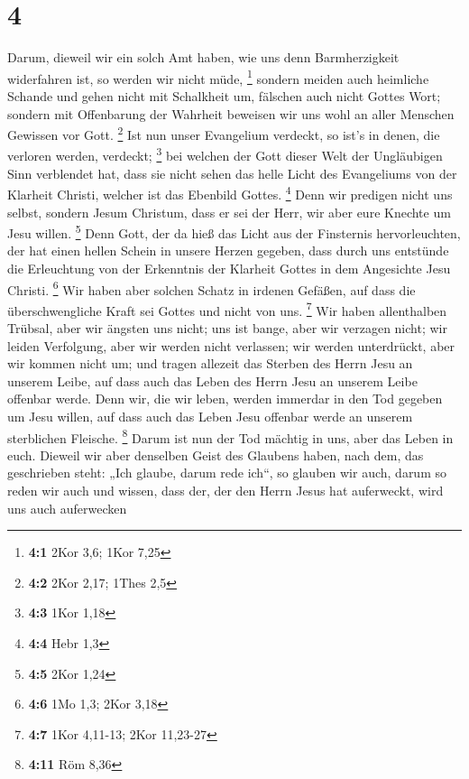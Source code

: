\hypertarget{section-3}{%
\section{4}\label{section-3}}

 Darum, dieweil wir ein solch Amt haben, wie uns denn
Barmherzigkeit widerfahren ist, so werden wir nicht müde, \footnote{\textbf{4:1}
  2Kor 3,6; 1Kor 7,25}  sondern meiden auch heimliche
Schande und gehen nicht mit Schalkheit um, fälschen auch nicht Gottes
Wort; sondern mit Offenbarung der Wahrheit beweisen wir uns wohl an
aller Menschen Gewissen vor Gott. \footnote{\textbf{4:2} 2Kor 2,17;
  1Thes 2,5}  Ist nun unser Evangelium verdeckt, so ist's
in denen, die verloren werden, verdeckt; \footnote{\textbf{4:3} 1Kor
  1,18}  bei welchen der Gott dieser Welt der Ungläubigen
Sinn verblendet hat, dass sie nicht sehen das helle Licht des
Evangeliums von der Klarheit Christi, welcher ist das Ebenbild Gottes.
\footnote{\textbf{4:4} Hebr 1,3}  Denn wir predigen nicht
uns selbst, sondern Jesum Christum, dass er sei der Herr, wir aber eure
Knechte um Jesu willen. \footnote{\textbf{4:5} 2Kor 1,24} 
Denn Gott, der da hieß das Licht aus der Finsternis hervorleuchten, der
hat einen hellen Schein in unsere Herzen gegeben, dass durch uns
entstünde die Erleuchtung von der Erkenntnis der Klarheit Gottes in dem
Angesichte Jesu Christi. \footnote{\textbf{4:6} 1Mo 1,3; 2Kor 3,18}
 Wir haben aber solchen Schatz in irdenen Gefäßen, auf
dass die überschwengliche Kraft sei Gottes und nicht von uns.
\footnote{\textbf{4:7} 1Kor 4,11-13; 2Kor 11,23-27}  Wir
haben allenthalben Trübsal, aber wir ängsten uns nicht; uns ist bange,
aber wir verzagen nicht;  wir leiden Verfolgung, aber wir
werden nicht verlassen; wir werden unterdrückt, aber wir kommen nicht
um;  und tragen allezeit das Sterben des Herrn Jesu an
unserem Leibe, auf dass auch das Leben des Herrn Jesu an unserem Leibe
offenbar werde.  Denn wir, die wir leben, werden immerdar
in den Tod gegeben um Jesu willen, auf dass auch das Leben Jesu offenbar
werde an unserem sterblichen Fleische. \footnote{\textbf{4:11} Röm 8,36}
 Darum ist nun der Tod mächtig in uns, aber das Leben in
euch.  Dieweil wir aber denselben Geist des Glaubens
haben, nach dem, das geschrieben steht: „Ich glaube, darum rede ich``,
so glauben wir auch, darum so reden wir auch  und wissen,
dass der, der den Herrn Jesus hat auferweckt, wird uns auch auferwecken
